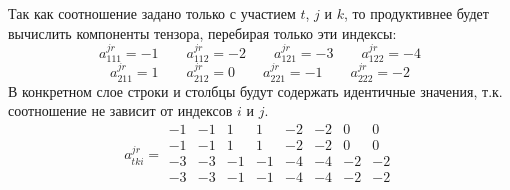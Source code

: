 \documentclass{article}
\begin{document}
\begin{center}
Так как соотношение задано только с участием $t$, $j$ и $k$, то продуктивнее будет вычислить компоненты тензора, перебирая только эти индексы:
$$a^{jr}_{111} = -1\qquad a^{jr}_{112} = -2\qquad a^{jr}_{121} = -3\qquad a^{jr}_{122} = -4$$
$$a^{jr}_{211} = 1\qquad a^{jr}_{212} = 0\qquad a^{jr}_{221} = -1\qquad a^{jr}_{222} = -2$$
В конкретном слое строки и столбцы будут содержать идентичные значения, т.к. соотношение не зависит от индексов $i$ и $j$.
$$a^{jr}_{tki} = \begin{array}{||cc|cc||cc|cc||}
-1 & -1 & 1 & 1 & -2 & -2 & 0 & 0 \\
-1 & -1 & 1 & 1 & -2 & -2 & 0 & 0 \\
\hline
-3 & -3 & -1 & -1 & -4 & -4 & -2 & -2 \\
-3 & -3 & -1 & -1 & -4 & -4 & -2 & -2 \\
\end{array}$$
\end{center}
\end{document}
